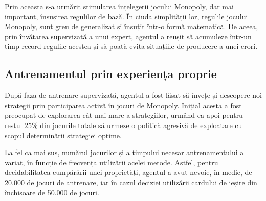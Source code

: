 Prin aceasta s-a urmărit stimularea înțelegerii jocului Monopoly, dar mai important, însușirea regulilor de bază. În ciuda simplității lor, regulile jocului Monopoly, sunt greu de generalizat și însuțit într-o formă matematică. De aceea, prin învățarea supervizată a unui expert, agentul a reușit să acumuleze într-un timp record regulile acestea și să poată evita situațiile de producere a unei erori.

\subsection{Antrenamentul prin experiența proprie}
După faza de antrenare supervizată, agentul a fost lăsat să învețe și descopere noi strategii prin participarea activă în jocuri de Monopoly. Inițial acesta a fost preocupat de explorarea cât mai mare a strategiilor, urmând ca apoi pentru restul 25\% din jocurile totale să urmeze o politică agresivă de exploatare cu scopul determinării strategiei optime.

La fel ca mai sus, numărul jocurilor și a timpului necesar antrenamentului a variat, în funcție de frecvența utilizării acelei metode. Astfel, pentru decidabilitatea cumpărării unei proprietăți, agentul a avut nevoie, în medie, de 20.000 de jocuri de antrenare, iar în cazul deciziei utilizării cardului de ieșire din închisoare de 50.000 de jocuri.
